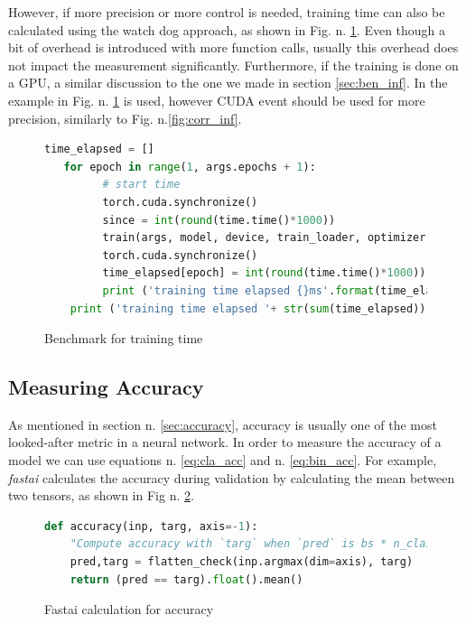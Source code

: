 However, if more precision or more control is needed, training time can also be calculated using the watch dog approach, as shown in Fig. n. \ref{fig:ben_tra}. Even though a bit of overhead is introduced with more function calls, usually this overhead does not impact the measurement significantly. Furthermore, if the training is done on a GPU, a similar discussion to the one we made in section \ref{sec:ben_inf}. In the example in Fig. n. \ref{fig:ben_tra} is used, however CUDA event should be used for more precision, similarly to Fig. n.\ref{fig:corr_inf}. 
\begin{figure}[h]
\begin{lstlisting}[language=python]
   time_elapsed = []
   for epoch in range(1, args.epochs + 1):
         # start time
         torch.cuda.synchronize()
         since = int(round(time.time()*1000))
         train(args, model, device, train_loader, optimizer, epoch)
         torch.cuda.synchronize()
         time_elapsed[epoch] = int(round(time.time()*1000)) - since
         print ('training time elapsed {}ms'.format(time_elapsed[epoch]))
    print ('training time elapsed '+ str(sum(time_elapsed)) + 'ms')
\end{lstlisting}
\caption{Benchmark for training time}
\label{fig:ben_tra}
\end{figure}




\subsection{Measuring Accuracy}
As mentioned in section n. \ref{sec:accuracy}, accuracy is usually one of the most looked-after metric in a neural network. In order to measure the accuracy of a model we can use equations n. \ref{eq:cla_acc} and n. \ref{eq:bin_acc}. For example, \textit{fastai} calculates the accuracy during validation by calculating the mean between two tensors, as shown in Fig n. \ref{fig:fast_acc}. \cite{fastaidocs}
\begin{figure}[h]
\begin{lstlisting}[language=python]
def accuracy(inp, targ, axis=-1):
    "Compute accuracy with `targ` when `pred` is bs * n_classes"
    pred,targ = flatten_check(inp.argmax(dim=axis), targ)
    return (pred == targ).float().mean()
\end{lstlisting}
\caption{Fastai calculation for accuracy \cite{fastaidocs}}
\label{fig:fast_acc}
\end{figure}













